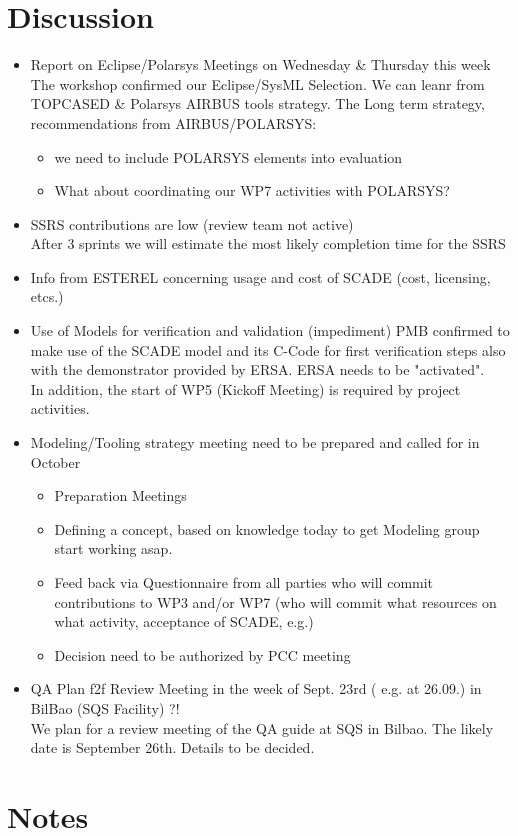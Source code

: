 \documentclass[a4paper, 11pt]{article}
\begin{document}
\section{Discussion}
\begin{itemize}
\item Report on Eclipse/Polarsys Meetings on Wednesday \& Thursday this week\\
The workshop confirmed our Eclipse/SysML Selection. We can leanr from TOPCASED \& Polarsys   AIRBUS tools strategy. The Long term strategy, recommendations from AIRBUS/POLARSYS:
\begin{itemize}
\item we need to include POLARSYS elements into evaluation
\item What about coordinating our WP7 activities with POLARSYS?
\end{itemize}

\item SSRS contributions are low (review team not active)\\
After 3 sprints we will estimate the most likely completion time for the SSRS 

\item Info from ESTEREL concerning usage and cost of SCADE (cost, licensing, etcs.)
\item Use of Models for verification and validation (impediment)
PMB confirmed to make use of the SCADE model and its C-Code for first verification steps also with the demonstrator provided by ERSA. ERSA needs to be "activated". \\
In addition, the start of WP5 (Kickoff Meeting) is required by project activities. 
\item Modeling/Tooling strategy meeting need to be prepared and called for in October 
\begin{itemize}
\item Preparation Meetings
\item Defining a concept, based on knowledge today to get Modeling group start working asap.
\item Feed back via Questionnaire from all parties who will commit contributions to WP3 and/or WP7 (who will commit what resources on what activity, acceptance of SCADE, e.g.)
\item Decision need to be authorized by PCC meeting
\end{itemize}

\item QA Plan f2f Review  Meeting in the week of Sept. 23rd ( e.g. at 26.09.) in BilBao (SQS Facility) ?!\\
We plan for a review meeting of the QA guide at SQS in Bilbao. The likely date is September 26th. Details to be decided.

\end{itemize}

\section{Notes}
\end{document}
